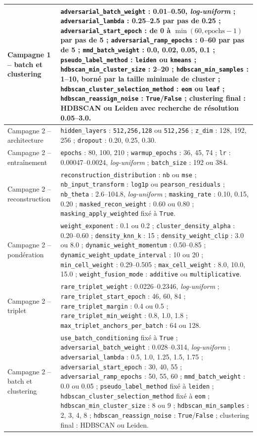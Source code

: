 {\begin{longtable}{p{}p{}}
Campagne 1 -- batch et clustering & \texttt{adversarial\_batch\_weight} : 0.01--0.50, \textit{log-uniform} ; \texttt{adversarial\_lambda} : 0.25--2.5 par pas de 0.25 ; \texttt{adversarial\_start\_epoch} : de 0 à \(\min(60,\mathrm{epochs}-1)\) par pas de 5 ; \texttt{adversarial\_ramp\_epochs} : 0--60 par pas de 5 ; \texttt{mmd\_batch\_weight} : 0.0, 0.02, 0.05, 0.1 ; \texttt{pseudo\_label\_method} : \texttt{leiden} ou \texttt{kmeans} ; \texttt{hdbscan\_min\_cluster\_size} : 2--20 ; \texttt{hdbscan\_min\_samples} : 1--10, borné par la taille minimale de cluster ; \texttt{hdbscan\_cluster\_selection\_method} : \texttt{eom} ou \texttt{leaf} ; \texttt{hdbscan\_reassign\_noise} : \texttt{True}/\texttt{False} ; clustering final : HDBSCAN ou Leiden avec recherche de résolution 0.05--3.0. \\
\midrule
Campagne 2 -- architecture & \texttt{hidden\_layers} : \texttt{512,256,128} ou \texttt{512,256} ; \texttt{z\_dim} : 128, 192, 256 ; \texttt{dropout} : 0.20, 0.25, 0.30. \\
Campagne 2 -- entraînement & \texttt{epochs} : 80, 100, 210 ; \texttt{warmup\_epochs} : 36, 45, 74 ; \texttt{lr} : 0.00047--0.0024, \textit{log-uniform} ; \texttt{batch\_size} : 192 ou 384. \\
Campagne 2 -- reconstruction & \texttt{reconstruction\_distribution} : \texttt{nb} ou \texttt{mse} ; \texttt{nb\_input\_transform} : \texttt{log1p} ou \texttt{pearson\_residuals} ; \texttt{nb\_theta} : 2.6--104.8, \textit{log-uniform} ; \texttt{masking\_rate} : 0.10, 0.15, 0.20 ; \texttt{masked\_recon\_weight} : 0.60 ou 0.80 ; \texttt{masking\_apply\_weighted} fixé à \texttt{True}. \\
Campagne 2 -- pondération & \texttt{weight\_exponent} : 0.1 ou 0.2 ; \texttt{cluster\_density\_alpha} : 0.20--0.60 ; \texttt{density\_knn\_k} : 15 ; \texttt{density\_weight\_clip} : 3.0 ou 8.0 ; \texttt{dynamic\_weight\_momentum} : 0.50--0.85 ; \texttt{dynamic\_weight\_update\_interval} : 10 ou 20 ; \texttt{min\_cell\_weight} : 0.29--0.505 ; \texttt{max\_cell\_weight} : 8.0, 10.0, 15.0 ; \texttt{weight\_fusion\_mode} : \texttt{additive} ou \texttt{multiplicative}. \\
Campagne 2 -- triplet & \texttt{rare\_triplet\_weight} : 0.0226--0.2346, \textit{log-uniform} ; \texttt{rare\_triplet\_start\_epoch} : 46, 60, 84 ; \texttt{rare\_triplet\_margin} : 0.4 ou 0.5 ; \texttt{rare\_triplet\_min\_weight} : 0.8, 1.0, 1.8 ; \texttt{max\_triplet\_anchors\_per\_batch} : 64 ou 128. \\
Campagne 2 -- batch et clustering & \texttt{use\_batch\_conditioning} fixé à \texttt{True} ; \texttt{adversarial\_batch\_weight} : 0.028--0.314, \textit{log-uniform} ; \texttt{adversarial\_lambda} : 0.5, 1.0, 1.25, 1.5, 1.75 ; \texttt{adversarial\_start\_epoch} : 30, 40, 55 ; \texttt{adversarial\_ramp\_epochs} : 50, 55, 60 ; \texttt{mmd\_batch\_weight} : 0.0 ou 0.05 ; \texttt{pseudo\_label\_method} fixé à \texttt{leiden} ; \texttt{hdbscan\_cluster\_selection\_method} fixé à \texttt{eom} ; \texttt{hdbscan\_min\_cluster\_size} : 8 ou 9 ; \texttt{hdbscan\_min\_samples} : 2, 3, 4, 8 ; \texttt{hdbscan\_reassign\_noise} : \texttt{True}/\texttt{False} ; clustering final : HDBSCAN ou Leiden. \\

\end{longtable}}
